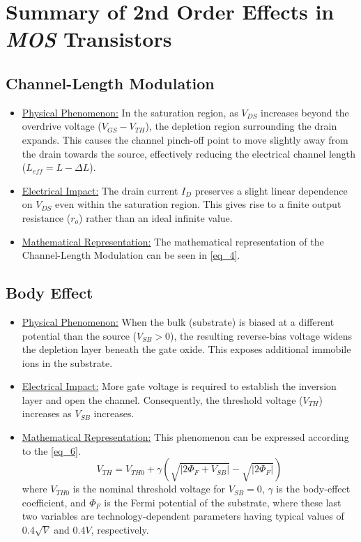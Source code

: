 \documentclass[12pt,a4paper]{article}
\begin{document}
\section{Summary of 2nd Order Effects in \textit{MOS} Transistors}
\subsection{Channel-Length Modulation}
\begin{itemize}
    \item \underline{Physical Phenomenon:} In the saturation region, as $V_{DS}$ increases beyond the overdrive voltage ($V_{GS} - V_{TH}$), the depletion region surrounding the drain expands. This causes the channel pinch-off point to move slightly away from the drain towards the source, effectively reducing the electrical channel length ($L_{eff} = L - \Delta L$). 
    \item \underline{Electrical Impact:} The drain current $I_{D}$ preserves a slight linear dependence on $V_{DS}$ even within the saturation region. This gives rise to a finite output resistance ($r_o$) rather than an ideal infinite value.
    \item \underline{Mathematical Representation:} The mathematical representation of the Channel-Length Modulation can be seen in \autoref{eq_4}.
\end{itemize}


\subsection{Body Effect}
\begin{itemize}
    \item \underline{Physical Phenomenon:} When the bulk (substrate) is biased at a different potential than the source ($V_{SB} > 0$), the resulting reverse-bias voltage widens the depletion layer beneath the gate oxide. This exposes additional immobile ions in the substrate.
    \item \underline{Electrical Impact:} More gate voltage is required to establish the inversion layer and open the channel. Consequently, the threshold voltage ($V_{TH}$) increases as $V_{SB}$ increases.
    \item \underline{Mathematical Representation:} This phenomenon can be expressed according to the \autoref{eq_6}.
    \begin{equation}
        V_{TH} = V_{TH0} + \gamma \left( \sqrt{|2\Phi_F + V_{SB}|} - \sqrt{|2\Phi_F|} \right)
        \label{eq_6}
    \end{equation}
    where $V_{TH0}$ is the nominal threshold voltage for $V_{SB}=0$, $\gamma$ is the body-effect coefficient, and $\Phi_F$ is the Fermi potential of the substrate, where these last two variables are technology-dependent parameters having typical values of $0.4\sqrt{V}$ and $0.4 V$, respectively. \cite[p. 293]{b1}
\end{itemize}
\end{document}
